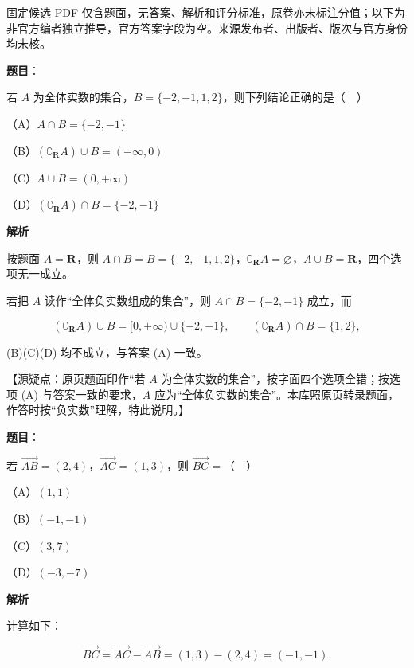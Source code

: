 

\begin{gktip}
固定候选 PDF 仅含题面，无答案、解析和评分标准，原卷亦未标注分值；以下为非官方编者独立推导，官方答案字段为空。来源发布者、出版者、版次与官方身份均未核。
\end{gktip}

\begin{answer}

\textbf{题目}：

若 $A$ 为全体实数的集合，$B=\{-2,-1,1,2\}$，则下列结论正确的是（　）

（A）$A\cap B=\{-2,-1\}$

（B）$(\complement_{\mathbf R}A)\cup B=(-\infty,0)$

（C）$A\cup B=(0,+\infty)$

（D）$(\complement_{\mathbf R}A)\cap B=\{-2,-1\}$

\textbf{解析}

按题面 $A=\mathbf R$，则 $A\cap B=B=\{-2,-1,1,2\}$，$\complement_{\mathbf R}A=\varnothing$，$A\cup B=\mathbf R$，四个选项无一成立。

若把 $A$ 读作“全体负实数组成的集合”，则 $A\cap B=\{-2,-1\}$ 成立，而

\nopagebreak[4]
\[(\complement_{\mathbf R}A)\cup B=[0,+\infty)\cup\{-2,-1\},\qquad (\complement_{\mathbf R}A)\cap B=\{1,2\},\]

(B)(C)(D) 均不成立，与答案 (A) 一致。

【源疑点：原页题面印作“若 $A$ 为全体实数的集合”，按字面四个选项全错；按选项 (A) 与答案一致的要求，$A$ 应为“全体负实数的集合”。本库照原页转录题面，作答时按“负实数”理解，特此说明。】


\end{answer}
\begin{answer}

\textbf{题目}：

若 $\overrightarrow{AB}=(2,4)$，$\overrightarrow{AC}=(1,3)$，则 $\overrightarrow{BC}=$（　）

（A）$(1,1)$

（B）$(-1,-1)$

（C）$(3,7)$

（D）$(-3,-7)$

\textbf{解析}

计算如下：

\nopagebreak[4]
\[\overrightarrow{BC}=\overrightarrow{AC}-\overrightarrow{AB}=(1,3)-(2,4)=(-1,-1).\]


\end{answer}
